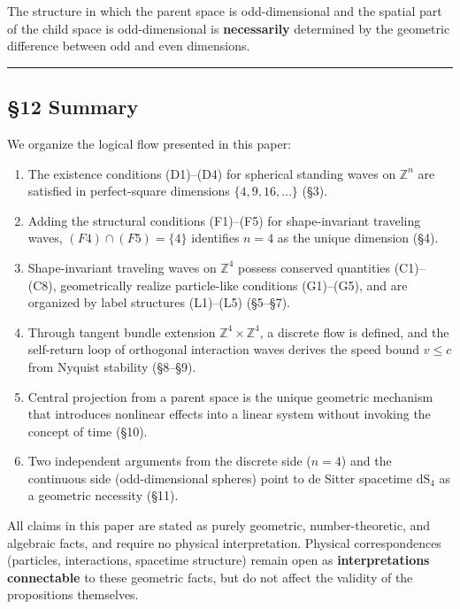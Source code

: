\documentclass[
  a4paper,11pt]{article}
\providecommand{\tightlist}{%
  \setlength{\itemsep}{0pt}\setlength{\parskip}{0pt}}
\theoremstyle{definition}
\theoremstyle{remark}
\begin{document}
The structure in which the parent space is odd-dimensional and the
spatial part of the child space is odd-dimensional is
\textbf{necessarily} determined by the geometric difference between odd
and even dimensions.

\begin{center}\rule{0.5\linewidth}{0.5pt}\end{center}

\subsection{§12 Summary}\label{summary}

We organize the logical flow presented in this paper:

\begin{enumerate}
\def\labelenumi{\arabic{enumi}.}
\tightlist
\item
  The existence conditions (D1)--(D4) for spherical standing waves on
  \(\mathbb{Z}^n\) are satisfied in perfect-square dimensions
  \(\{4, 9, 16, \ldots\}\) (§3).
\item
  Adding the structural conditions (F1)--(F5) for shape-invariant
  traveling waves, \((F4) \cap (F5) = \{4\}\) identifies \(n = 4\) as
  the unique dimension (§4).
\item
  Shape-invariant traveling waves on \(\mathbb{Z}^4\) possess conserved
  quantities (C1)--(C8), geometrically realize particle-like conditions
  (G1)--(G5), and are organized by label structures (L1)--(L5) (§5--§7).
\item
  Through tangent bundle extension \(\mathbb{Z}^4 \times \mathbb{Z}^4\),
  a discrete flow is defined, and the self-return loop of orthogonal
  interaction waves derives the speed bound \(v \leq c\) from Nyquist
  stability (§8--§9).
\item
  Central projection from a parent space is the unique geometric
  mechanism that introduces nonlinear effects into a linear system
  without invoking the concept of time (§10).
\item
  Two independent arguments from the discrete side (\(n = 4\)) and the
  continuous side (odd-dimensional spheres) point to de Sitter spacetime
  \(\mathrm{dS}_4\) as a geometric necessity (§11).
\end{enumerate}

All claims in this paper are stated as purely geometric,
number-theoretic, and algebraic facts, and require no physical
interpretation. Physical correspondences (particles, interactions,
spacetime structure) remain open as \textbf{interpretations connectable}
to these geometric facts, but do not affect the validity of the
propositions themselves.
\end{document}
